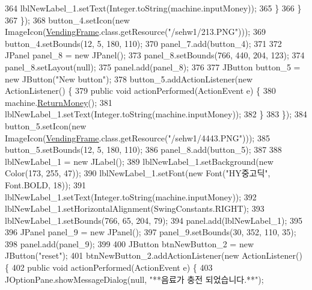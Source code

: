 \begin{DoxyCode}
364                     lblNewLabel\_1.setText(Integer.toString(machine.inputMoney));
365                 \}
366             \}
367         \});
368         button\_4.setIcon(\textcolor{keyword}{new} ImageIcon(\hyperlink{classsehw1_1_1_vending_frame_a82f3d8fe653c04d594b0a46e751328a0}{VendingFrame}.class.getResource(\textcolor{stringliteral}{"/sehw1/213.PNG"})));
369         button\_4.setBounds(12, 5, 180, 110);
370         panel\_7.add(button\_4);
371         
372         JPanel panel\_8 = \textcolor{keyword}{new} JPanel();
373         panel\_8.setBounds(766, 440, 204, 123);
374         panel\_8.setLayout(null);
375         panel.add(panel\_8);
376         
377         JButton button\_5 = \textcolor{keyword}{new} JButton(\textcolor{stringliteral}{"New button"});
378         button\_5.addActionListener(\textcolor{keyword}{new} ActionListener() \{
379             \textcolor{keyword}{public} \textcolor{keywordtype}{void} actionPerformed(ActionEvent e) \{
380                 machine.\hyperlink{classsehw1_1_1machine_ae75137426efb32e6f6091d8b5e883610}{ReturnMoney}();
381                 lblNewLabel\_1.setText(Integer.toString(machine.inputMoney));
382             \}
383         \});
384         button\_5.setIcon(\textcolor{keyword}{new} ImageIcon(\hyperlink{classsehw1_1_1_vending_frame_a82f3d8fe653c04d594b0a46e751328a0}{VendingFrame}.class.getResource(\textcolor{stringliteral}{"/sehw1/4443.PNG"})));
385         button\_5.setBounds(12, 5, 180, 110);
386         panel\_8.add(button\_5);
387         
388         lblNewLabel\_1 = \textcolor{keyword}{new} JLabel();
389         lblNewLabel\_1.setBackground(\textcolor{keyword}{new} Color(173, 255, 47));
390         lblNewLabel\_1.setFont(\textcolor{keyword}{new} Font(\textcolor{stringliteral}{"HY중고딕"}, Font.BOLD, 18));
391         lblNewLabel\_1.setText(Integer.toString(machine.inputMoney));
392         lblNewLabel\_1.setHorizontalAlignment(SwingConstants.RIGHT);
393         lblNewLabel\_1.setBounds(766, 65, 204, 79);
394         panel.add(lblNewLabel\_1);
395         
396         JPanel panel\_9 = \textcolor{keyword}{new} JPanel();
397         panel\_9.setBounds(30, 352, 110, 35);
398         panel.add(panel\_9);
399         
400         JButton btnNewButton\_2 = \textcolor{keyword}{new} JButton(\textcolor{stringliteral}{"reset"});
401         btnNewButton\_2.addActionListener(\textcolor{keyword}{new} ActionListener() \{
402             \textcolor{keyword}{public} \textcolor{keywordtype}{void} actionPerformed(ActionEvent e) \{
403                 JOptionPane.showMessageDialog(null, \textcolor{stringliteral}{"**음료가 충전 되었습니다.**"});

\end{DoxyCode}
